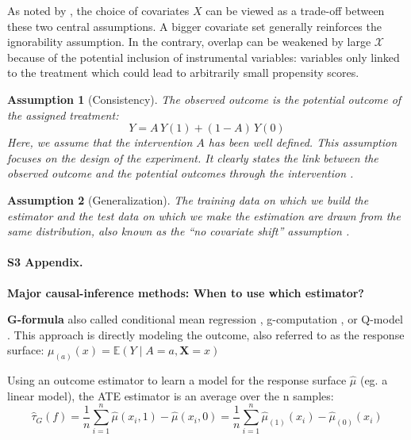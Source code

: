 \documentclass[10pt,letterpaper]{article}
\newtheorem{assumption}{Assumption}
\begin{document}
As noted by \cite{damour2020overlap}, the choice of covariates $X$ can
be viewed as a trade-off between these two central assumptions. A bigger
covariate set generally reinforces the ignorability assumption. In the
contrary, overlap can be weakened by large $\mathcal{X}$ because of the
potential inclusion of instrumental variables: variables only linked to the treatment which
could lead to arbitrarily small propensity scores.


\begin{assumption}[Consistency]\label{assumption:consistency} The observed
  outcome is the potential outcome of the assigned treatment:
  \begin{equation}\label{eq:consistancy}
    Y = A \, Y(1) + (1-A) \, Y(0)
  \end{equation}
  Here, we assume that the intervention $A$ has been well defined. This
  assumption focuses on the design of the experiment. It clearly states the link
  between the observed outcome and the potential outcomes through the
  intervention \cite{hernan2020causal}.
\end{assumption}

\begin{assumption}[Generalization]\label{assumption:generalization} The training
  data on which we build the estimator and the test data on which we make the
  estimation are drawn from the same distribution, also known as
  the ``no covariate shift'' assumption \cite{jesson2020identifying}.
\end{assumption}
\clearpage



\paragraph*{S3 Appendix.}
\label{apd:causal_estimators}
{\bf Major causal-inference methods: When to use which estimator?}


\textbf{G-formula} also called conditional mean regression
\cite{wendling2018comparing}, g-computation \cite{robins1986role}, or
Q-model \cite{snowden2011implementation}. This approach is directly modeling
the outcome, also referred to as the response surface: $\mu_{(a)}(x)
  =\mathbb{E}\left(Y \mid A=a, \mathbf{X}=x\right)$

Using an outcome estimator to learn a model for the response surface $\hat
  \mu$ (eg. a linear model), the ATE estimator is an average over the n samples:
\begin{equation}
  \hat{\tau}_G(f) = \frac{1}{n} \sum_{i=1}^n \hat \mu(x_i, 1) - \hat \mu(x_i, 0) = \frac{1}{n} \sum_{i=1}^n \hat \mu_{(1)}(x_i) - \hat \mu_{(0)}(x_i)
\end{equation}
\end{document}
